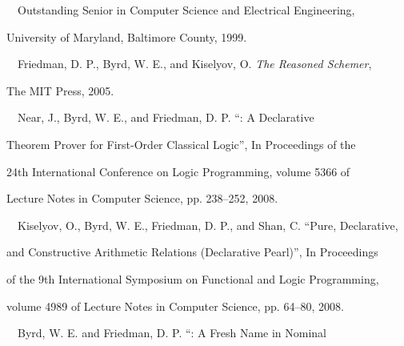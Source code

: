 \medskip

\noindent \ \ Outstanding Senior in Computer Science and Electrical Engineering, 

\noindent \hspace{1cm} University of Maryland, Baltimore County, 1999.

\bigskip


\medskip

\noindent\ \ Friedman, D. P., Byrd, W. E., and Kiselyov, O. {\it The Reasoned Schemer},

\noindent \hspace{1cm} The MIT Press, 2005.



\bigskip


\medskip

\noindent\ \ Near, J., Byrd, W. E., and Friedman, D. P. ``\alphatap: A Declarative 

\noindent \hspace{1cm} Theorem Prover for First-Order Classical Logic'', In Proceedings of the

\noindent \hspace{1cm}  24th International Conference on Logic Programming, volume 5366 of

\noindent \hspace{1cm}  Lecture Notes in Computer Science, pp. 238--252, 2008.

\medskip

\noindent\ \ Kiselyov, O., Byrd, W. E., Friedman, D. P., and Shan, C. ``Pure, Declarative, 

\noindent \hspace{1cm} and Constructive Arithmetic Relations (Declarative Pearl)'', In Proceedings 

\noindent \hspace{1cm}  of the 9th International Symposium on Functional and Logic Programming, 

\noindent \hspace{1cm}  volume 4989 of Lecture Notes in Computer Science, pp. 64--80, 2008.

\bigskip


\medskip

\noindent\ \ Byrd, W. E. and Friedman, D. P. ``\alphakanren: A Fresh Name in Nominal


